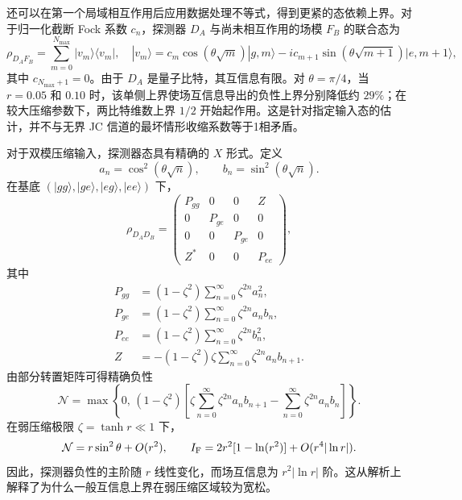 \documentclass[UTF8,11pt,a4paper,fontset=none]{ctexart}
\begin{document}
还可以在第一个局域相互作用后应用数据处理不等式，得到更紧的态依赖上界。对于归一化截断 Fock 系数 $c_n$，探测器 $D_A$ 与尚未相互作用的场模 $F_B$ 的联合态为
\begin{equation}
\rho_{D_AF_B}=\sum_{m=0}^{N_{\max}}|v_m\rangle\langle v_m|,
\quad
|v_m\rangle=c_m\cos(\theta\sqrt m)|g,m\rangle
-i c_{m+1}\sin(\theta\sqrt{m+1})|e,m+1\rangle,
\label{eq:jc-one-sided-state}
\end{equation}
其中 $c_{N_{\max}+1}=0$。由于 $D_A$ 是量子比特，其互信息有限。对 $\theta=\pi/4$，当 $r=0.05$ 和 $0.10$ 时，该单侧上界使场互信息导出的负性上界分别降低约 $29\%$；在较大压缩参数下，两比特维数上界 $1/2$ 开始起作用。这是针对指定输入态的估计，并不与无界 JC 信道的最坏情形收缩系数等于1相矛盾。

对于双模压缩输入，探测器态具有精确的 $X$ 形式。定义
\begin{equation}
a_n=\cos^2(\theta\sqrt n),\qquad b_n=\sin^2(\theta\sqrt n).
\label{eq:jc-ab-definitions}
\end{equation}
在基底 $(|gg\rangle,|ge\rangle,|eg\rangle,|ee\rangle)$ 下，
\begin{equation}
\rho_{D_AD_B}=
\begin{pmatrix}
P_{gg}&0&0&Z\\
0&P_{ge}&0&0\\
0&0&P_{ge}&0\\
Z^*&0&0&P_{ee}
\end{pmatrix},
\label{eq:tmsv-jc-x-state}
\end{equation}
其中
\begin{align}
P_{gg}&=(1-\zeta^2)\sum_{n=0}^{\infty}\zeta^{2n}a_n^2,\nonumber\\
P_{ge}&=(1-\zeta^2)\sum_{n=0}^{\infty}\zeta^{2n}a_nb_n,\nonumber\\
P_{ee}&=(1-\zeta^2)\sum_{n=0}^{\infty}\zeta^{2n}b_n^2,\label{eq:tmsv-jc-x-populations}\\
Z&=-(1-\zeta^2)\zeta\sum_{n=0}^{\infty}\zeta^{2n}a_nb_{n+1}.\nonumber
\end{align}
由部分转置矩阵可得精确负性
\begin{equation}
\mathcal N=
\max\left\{0,\,
(1-\zeta^2)\left[
\zeta\sum_{n=0}^{\infty}\zeta^{2n}a_nb_{n+1}
-\sum_{n=0}^{\infty}\zeta^{2n}a_nb_n
\right]\right\}.
\label{eq:tmsv-jc-exact-negativity}
\end{equation}
在弱压缩极限 $\zeta=\tanh r\ll1$ 下，
\begin{equation}
\mathcal N=r\sin^2\theta+O(r^2),
\qquad
I_{\rm F}=2r^2[1-\ln(r^2)]+O(r^4|\ln r|).
\label{eq:jc-weak-squeezing}
\end{equation}
因此，探测器负性的主阶随 $r$ 线性变化，而场互信息为 $r^2|\ln r|$ 阶。这从解析上解释了为什么一般互信息上界在弱压缩区域较为宽松。
\end{document}

